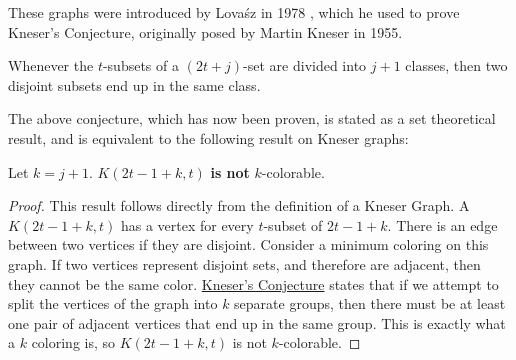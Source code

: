 These graphs were introduced by Lova\'{s}z in 1978 \cite{lovasz_knesers_1978}, which he used to prove Kneser's Conjecture, originally posed by Martin Kneser in 1955.

\begin{kneserconjecture}
    \label{thm:kneser-conjecture}
    Whenever the $t$-subsets of a $(2t+j)$-set are divided into $j+1$ classes, then two disjoint subsets end up in the same class. 
\end{kneserconjecture}

The above conjecture, which has now been proven, is stated as a set theoretical result, and is equivalent to the following result on Kneser graphs:

\begin{corollary}
    \label{cor:no}
    Let $k=j+1$. $K(2t-1+k,t)$ \textbf{is not} $k$-colorable.
\end{corollary}

\begin{proof}
     This result follows directly from the definition of a Kneser Graph. A $K(2t-1+k,t)$ has a vertex for every $t$-subset of $2t-1+k$. There is an edge between two vertices if they are disjoint. Consider a minimum coloring on this graph. If two vertices represent disjoint sets, and therefore are adjacent, then they cannot be the same color. \hyperref[thm:kneser-conjecture]{Kneser's Conjecture}  states that if we attempt to split the vertices of the graph into $k$ separate groups, then there must be at least one pair of adjacent vertices that end up in the same group. This is exactly what a $k$ coloring is, so $K(2t-1+k,t)$ is not $k$-colorable.
\end{proof}